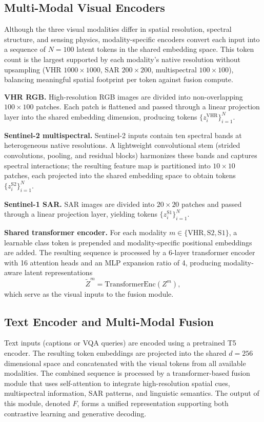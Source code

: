 \subsection{Multi-Modal Visual Encoders}
\label{sec:chap6_method_encoders}

Although the three visual modalities differ in spatial resolution,
spectral structure, and sensing physics, modality-specific encoders
convert each input into a sequence of $N = 100$ latent tokens in the
shared embedding space. This token count is the largest supported by
each modality's native resolution without upsampling (VHR
$1000\times1000$, SAR $200\times200$, multispectral $100\times100$),
balancing meaningful spatial footprint per token against fusion
compute.

\textbf{VHR RGB.} High-resolution RGB images are divided into
non-overlapping $100\times100$ patches. Each patch is flattened and
passed through a linear projection layer into the shared embedding
dimension, producing tokens $\{z^{\text{VHR}}_i\}_{i=1}^{N}$.

\textbf{Sentinel-2 multispectral.} Sentinel-2 inputs contain ten
spectral bands at heterogeneous native resolutions. A lightweight
convolutional stem (strided convolutions, pooling, and residual
blocks) harmonizes these bands and captures spectral interactions; the
resulting feature map is partitioned into $10\times10$ patches, each
projected into the shared embedding space to obtain tokens
$\{z^{\text{S2}}_i\}_{i=1}^{N}$.

\textbf{Sentinel-1 SAR.} SAR images are divided into $20\times20$
patches and passed through a linear projection layer, yielding tokens
$\{z^{\text{S1}}_i\}_{i=1}^{N}$.

\textbf{Shared transformer encoder.} For each modality
$m \in \{\text{VHR}, \text{S2}, \text{S1}\}$, a learnable class token
is prepended and modality-specific positional embeddings are added.
The resulting sequence is processed by a 6-layer transformer encoder
with 16 attention heads and an MLP expansion ratio of 4, producing
modality-aware latent representations
\[
\tilde{Z}^{m} = \text{TransformerEnc}(Z^{m}),
\]
which serve as the visual inputs to the fusion module.

\subsection{Text Encoder and Multi-Modal Fusion}
\label{sec:chap6_method_fusion}

Text inputs (captions or VQA queries) are encoded using a pretrained
T5 encoder. The resulting token embeddings are projected into the
shared $d = 256$ dimensional space and concatenated with the visual
tokens from all available modalities. The combined sequence is
processed by a transformer-based fusion module that uses self-attention
to integrate high-resolution spatial cues, multispectral information,
SAR patterns, and linguistic semantics. The output of this module,
denoted $F$, forms a unified representation supporting both contrastive
learning and generative decoding.

